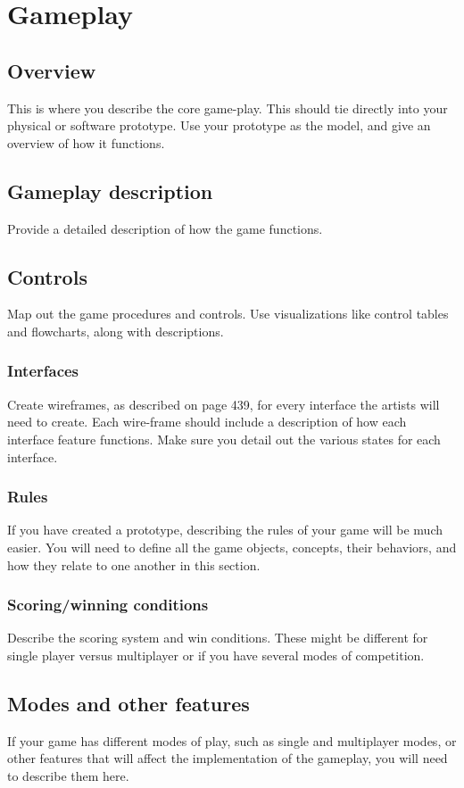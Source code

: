 \chapter{Gameplay}
\section{Overview} %
This is where you describe the core game-play. This should tie directly into your physical or software prototype. Use your prototype as the model, and give an overview of how it functions.

\section{Gameplay description} %
Provide a detailed description of how the game functions.

\section{Controls} %
Map out the game procedures and controls. Use visualizations like control tables and flowcharts, along with descriptions.
\subsection{Interfaces} %
Create wireframes, as described on page 439, for every interface the artists will need to create. Each wire-frame should include a description of how each interface feature functions. Make sure you detail out the various states for each interface.
\subsection{Rules} %
If you have created a prototype, describing the rules of your game will be much easier. You will need to define all the game objects, concepts, their behaviors, and how they relate to one another in this section.
\subsection{Scoring/winning conditions}%
Describe the scoring system and win conditions. These might be different for single player versus multiplayer or if you have several modes of competition.

\section{Modes and other features} %
If your game has different modes of play, such as single and multiplayer modes, or other features that will affect the implementation of the gameplay, you will need to describe them here.

